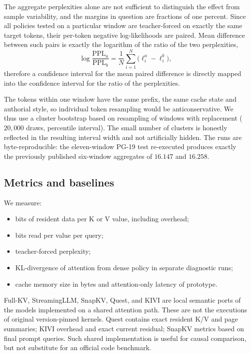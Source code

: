 \documentclass[10pt,twocolumn]{article}
\newcommand{\pg}{PG-19}
\begin{document}
The aggregate perplexities alone are not sufficient to distinguish the effect
from sample variability, and the margins in question are fractions of one
percent. Since all policies tested on a particular window are teacher-forced
on exactly the same target tokens, their per-token negative log-likelihoods
are paired. Mean difference between such pairs is exactly the logarithm of
the ratio of the two perplexities,
\begin{equation}
\log\frac{\mathrm{PPL}_a}{\mathrm{PPL}_b}
  = \frac{1}{N}\sum_{i=1}^{N}\bigl(\ell^{a}_i - \ell^{b}_i\bigr),
\label{eq:paired}
\end{equation}
therefore a confidence interval for the mean paired difference is directly
mapped into the confidence interval for the ratio of the perplexities.

The tokens within one window have the same prefix, the same cache state and
authorial style, so individual token resampling would be anticonservative. We
thus use a cluster bootstrap based on resampling of windows with replacement
($20{,}000$ draws, percentile interval). The small number of clusters is
honestly reflected in the resulting interval width and not artificially
hidden. The runs are byte-reproducible: the eleven-window \pg{} test re-executed
produces exactly the previously published six-window aggregates of $16.147$
and $16.258$.


\subsection{Metrics and baselines}

We measure:

\begin{itemize}\itemsep1pt
\item bits of resident data per K or V value, including overhead;
\item bits read per value per query;
\item teacher-forced perplexity;
\item KL-divergence of attention from dense policy in separate diagnostic runs;
\item cache memory size in bytes and attention-only latency of prototype.
\end{itemize}

Full-KV, StreamingLLM, SnapKV, Quest, and KIVI are local semantic ports
of the models implemented on a shared attention path. These are not the
executions of original version-pinned kernels. Quest contains exact resident
K/V and page summaries; KIVI overhead and exact current residual; SnapKV
metrics based on final prompt queries. Such shared implementation is useful
for causal comparison, but not substitute for an official code benchmark.
\end{document}
